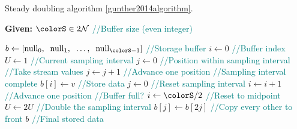 \begin{algorithm}[H]
\caption{Steady doubling algorithm \ref{gunther2014algorithm}.}
\label{alg:control-doubling-steady}
\begin{minipage}{0.5\textwidth}
    \hspace*{\algorithmicindent} \textbf{Given:} $\colorS \in 2\mathcal{N}$ \textcolor{teal}{\small//Buffer size (even integer)}
    \hspace*{\algorithmicindent}    \begin{algorithmic}[1]
        \State $b \gets [\mathrm{null}_0,\;\; \mathrm{null}_1,\;\; \ldots,\;\; \mathrm{null}_{\colorS - 1}]$ \textcolor{teal}{\small//Storage buffer}
        \State $i \gets 0$ \textcolor{teal}{\small//Buffer index}
        \State $U \gets 1$ \textcolor{teal}{\small//Current sampling interval}
        \State $j \gets 0$ \textcolor{teal}{\small//Position within sampling interval}
         \textcolor{teal}{\small//Take stream values}
        \State $j \gets j + 1$  \textcolor{teal}{\small//Advance one position}
          \textcolor{teal}{\small//Sampling interval complete}
        \State $b[i] \gets v$ \textcolor{teal}{\small//Store data}
        \State $j \gets 0$  \textcolor{teal}{\small//Reset sampling interval}
        \State $i \gets i + 1$  \textcolor{teal}{\small//Advance one position}
         \textcolor{teal}{\small//Buffer full?}
        \State $i \gets \colorS / 2$ \textcolor{teal}{\small//Reset to midpoint}
        \State $U \gets 2U$ \textcolor{teal}{\small//Double the sampling interval}
        \For{$j \in [0\twodots \colorS/2)$}
        \State $b[j] \gets b[2j]$ \textcolor{teal}{\small//Copy every other to front}
        \EndFor
        \EndIf
        \EndIf
        \EndFor
        \Return $b$ \textcolor{teal}{\small//Final stored data}
    \end{algorithmic}
\end{minipage}
\end{algorithm}
